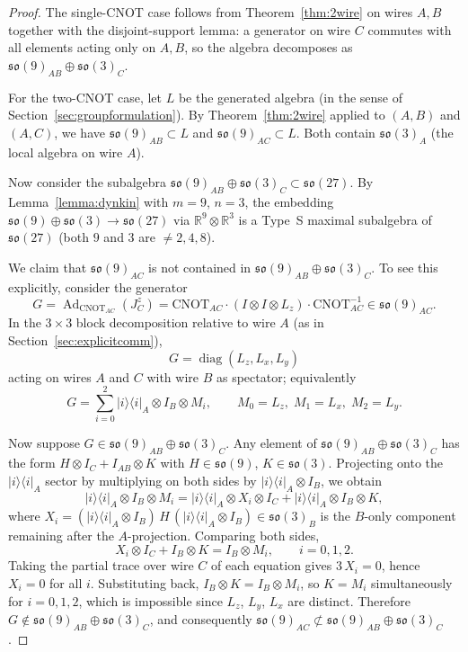 \documentclass[12pt,a4paper]{article}
\newcommand{\Ad}{\operatorname{Ad}}
\begin{document}
\begin{proof}
The single-CNOT case follows from Theorem~\ref{thm:2wire} on wires
$A,B$ together with the disjoint-support lemma: a generator on wire $C$
commutes with all elements acting only on $A,B$, so the algebra
decomposes as $\mathfrak{so}(9)_{AB} \oplus \mathfrak{so}(3)_C$.

For the two-CNOT case, let $L$ be the generated algebra (in the sense of
Section~\ref{sec:groupformulation}). By Theorem~\ref{thm:2wire} applied
to $(A,B)$ and $(A,C)$, we have $\mathfrak{so}(9)_{AB} \subset L$ and
$\mathfrak{so}(9)_{AC} \subset L$. Both contain $\mathfrak{so}(3)_A$
(the local algebra on wire $A$).

Now consider the subalgebra $\mathfrak{so}(9)_{AB} \oplus \mathfrak{so}(3)_C
\subset \mathfrak{so}(27)$. By Lemma~\ref{lemma:dynkin} with $m=9$, $n=3$,
the embedding $\mathfrak{so}(9)\oplus\mathfrak{so}(3) \to
\mathfrak{so}(27)$ via $\mathbb{R}^9\otimes\mathbb{R}^3$ is a Type~S maximal
subalgebra of $\mathfrak{so}(27)$ (both $9$ and $3$ are $\neq 2,4,8$).

We claim that $\mathfrak{so}(9)_{AC}$ is not contained in
$\mathfrak{so}(9)_{AB}\oplus\mathfrak{so}(3)_C$. To see this explicitly,
consider the generator
\[
G = \Ad_{\text{CNOT}_{AC}}(J_C^z) = \text{CNOT}_{AC} \cdot (I \otimes I
\otimes L_z) \cdot \text{CNOT}_{AC}^{-1} \in \mathfrak{so}(9)_{AC}.
\]
In the $3\times 3$ block decomposition relative to wire $A$ (as in
Section~\ref{sec:explicitcomm}),
\[
G = \operatorname{diag}(L_z, L_x, L_y)
\]
acting on wires $A$ and $C$ with wire $B$ as spectator; equivalently
\[
G = \sum_{i=0}^{2} |i\rangle\langle i|_A \otimes I_B \otimes M_i,
\qquad M_0 = L_z,\; M_1 = L_x,\; M_2 = L_y.
\]

Now suppose $G \in \mathfrak{so}(9)_{AB}\oplus\mathfrak{so}(3)_C$. Any
element of $\mathfrak{so}(9)_{AB}\oplus\mathfrak{so}(3)_C$ has the form
$H \otimes I_C + I_{AB} \otimes K$ with $H \in \mathfrak{so}(9)$,
$K \in \mathfrak{so}(3)$. Projecting onto the $|i\rangle\langle i|_A$
sector by multiplying on both sides by $|i\rangle\langle i|_A \otimes I_B$,
we obtain
\[
|i\rangle\langle i|_A \otimes I_B \otimes M_i
= |i\rangle\langle i|_A \otimes X_i \otimes I_C
+ |i\rangle\langle i|_A \otimes I_B \otimes K,
\]
where $X_i = (|i\rangle\langle i|_A \otimes I_B)\, H\,
(|i\rangle\langle i|_A \otimes I_B) \in \mathfrak{so}(3)_B$ is the
$B$-only component remaining after the $A$-projection. Comparing both
sides,
\[
X_i \otimes I_C + I_B \otimes K = I_B \otimes M_i,\qquad i=0,1,2.
\]
Taking the partial trace over wire $C$ of each equation gives
$3\,X_i = 0$, hence $X_i = 0$ for all $i$. Substituting back,
$I_B \otimes K = I_B \otimes M_i$, so $K = M_i$ simultaneously for
$i=0,1,2$, which is impossible since $L_z$, $L_y$, $L_x$ are distinct.
Therefore $G \notin \mathfrak{so}(9)_{AB} \oplus \mathfrak{so}(3)_C$, and
consequently $\mathfrak{so}(9)_{AC} \not\subset
\mathfrak{so}(9)_{AB}\oplus\mathfrak{so}(3)_C$.


\end{proof}
\end{document}
